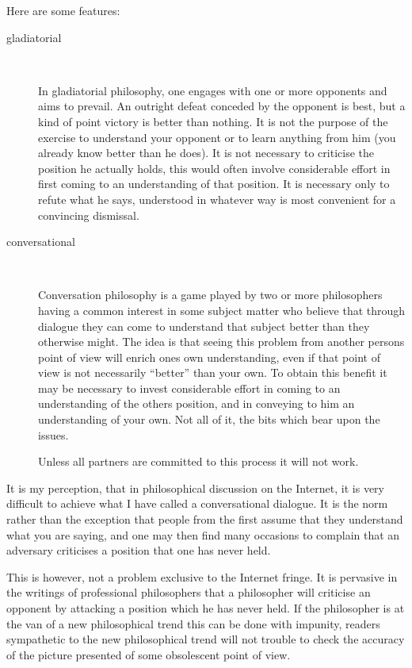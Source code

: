 \documentclass[10pt,titlepage]{book}
\begin{document}
Here are some features:

\begin{description}

\item[gladiatorial] \ 

In gladiatorial philosophy, one engages with one or more opponents and aims to prevail.
An outright defeat conceded by the opponent is best, but a kind of point victory is better than nothing.
It is not the purpose of the exercise to understand your opponent or to learn anything from him (you already know better than he does).
It is not necessary to criticise the position he actually holds, this would often involve considerable effort in first coming to an understanding of that position.
It is necessary only to refute what he says, understood in whatever way is most convenient for a convincing dismissal.

\item[conversational] \ 

Conversation philosophy is a game played by two or more philosophers having a common interest in some subject matter who believe that through dialogue they can come to understand that subject better than they otherwise might.
The idea is that seeing this problem from another persons point of view will enrich ones own understanding, even if that point of view is not necessarily ``better'' than your own.
To obtain this benefit it may be necessary to invest considerable effort in coming to an understanding of the others position, and in conveying to him an understanding of your own.
Not all of it, the bits which bear upon the issues.

Unless all partners are committed to this process it will not work.
\end{description}

It is my perception, that in philosophical discussion on the Internet, it is very difficult to achieve what I have called a conversational dialogue.
It is the norm rather than the exception that people from the first assume that they understand what you are saying, and one may then find many occasions to complain that an adversary criticises a position that one has never held.

This is however, not a problem exclusive to the Internet fringe.
It is pervasive in the writings of professional philosophers that a philosopher will criticise an opponent by attacking a position which he has never held.
If the philosopher is at the van of a new philosophical trend this can be done with impunity, readers sympathetic to the new philosophical trend will not trouble to check the accuracy of the picture presented of some obsolescent point of view.
\end{document}
